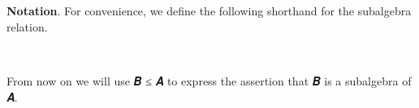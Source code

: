 \begin{code}
\AgdaSymbol{(}\AgdaSymbol{\{}\AgdaSpace{}%
\AgdaSymbol{=}\AgdaSpace{}%
\AgdaSpace{}%
\AgdaSpace{}%
\AgdaSpace{}%
\AgdaSymbol{\}\{}\AgdaSpace{}%
\AgdaSpace{}%
\AgdaSpace{}%
\AgdaSpace{}%
\AgdaSymbol{\}}\AgdaSpace{}%
\AgdaSymbol{))}\<%
\\
%
\>[19]\AgdaComment{---------------------------------------------------------------}\<%
\\
%
\>[1]%
\>[19]\AgdaSymbol{((}\AgdaSpace{}%
\AgdaSymbol{)}\AgdaSpace{}%
\AgdaOperator{\AgdaFunction{[}}\AgdaSpace{}%
\AgdaSpace{}%
\AgdaOperator{\AgdaFunction{]/ker}}\AgdaSpace{}%
\AgdaSymbol{)}\AgdaSpace{}%
\AgdaSpace{}%
\<%
\\
%
\\[\AgdaEmptyExtraSkip]%
\>[0]\AgdaSpace{}%
\AgdaSpace{}%
\AgdaSpace{}%
\AgdaSpace{}%
\AgdaSpace{}%
\AgdaSpace{}%
\AgdaSpace{}%
\AgdaSpace{}%
\AgdaSpace{}%
\AgdaSymbol{=}\AgdaSpace{}%
\AgdaSpace{}%
\AgdaSpace{}%
\AgdaSpace{}%
\AgdaSymbol{(}\AgdaSpace{}%
\AgdaSymbol{)}\AgdaSpace{}%
\AgdaSpace{}%
\AgdaSpace{}%
\AgdaSpace{}%
\AgdaSpace{}%
\<%
\end{code}
\ccpad
\textbf{Notation}. For convenience, we define the following shorthand for the subalgebra relation.
\ccpad
\begin{code}%
\>[0]\AgdaSpace{}%
\AgdaSymbol{:}\AgdaSpace{}%
\AgdaSymbol{\{}\AgdaSpace{}%
\AgdaSpace{}%
\AgdaSymbol{:}\AgdaSpace{}%
\AgdaSymbol{\}(}\AgdaSpace{}%
\AgdaSymbol{:}\AgdaSpace{}%
\AgdaSpace{}%
\AgdaSpace{}%
\AgdaSymbol{)(}\AgdaSpace{}%
\AgdaSymbol{:}\AgdaSpace{}%
\AgdaSpace{}%
\AgdaSpace{}%
\AgdaSymbol{)}\AgdaSpace{}%
\AgdaSpace{}%
\AgdaSpace{}%
\AgdaSpace{}%
\AgdaSpace{}%
\AgdaSpace{}%
\AgdaSpace{}%
\AgdaSpace{}%
\AgdaSpace{}%
\<%
\\
\>[0]\AgdaSpace{}%
\AgdaSpace{}%
\AgdaSpace{}%
\AgdaSymbol{=}\AgdaSpace{}%
\AgdaSpace{}%
\AgdaSpace{}%
\<%
\end{code}
\ccpad
From now on we will use \ab 𝑩 \af ≤ \ab 𝑨 to express the assertion that \ab 𝑩 is a subalgebra of \ab 𝑨.






